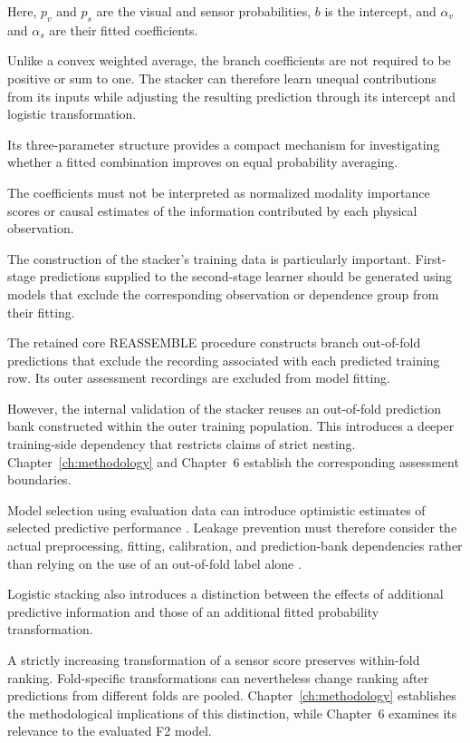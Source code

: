 Here, \(p_v\) and \(p_s\) are the visual and sensor probabilities, \(b\) is the intercept, and \(\alpha_v\) and \(\alpha_s\) are their fitted coefficients.

Unlike a convex weighted average, the branch coefficients are not required to be positive or sum to one. The stacker can therefore learn unequal contributions from its inputs while adjusting the resulting prediction through its intercept and logistic transformation.

Its three-parameter structure provides a compact mechanism for investigating whether a fitted combination improves on equal probability averaging.

The coefficients must not be interpreted as normalized modality importance scores or causal estimates of the information contributed by each physical observation.

The construction of the stacker’s training data is particularly important. First-stage predictions supplied to the second-stage learner should be generated using models that exclude the corresponding observation or dependence group from their fitting.

The retained core REASSEMBLE procedure constructs branch out-of-fold predictions that exclude the recording associated with each predicted training row. Its outer assessment recordings are excluded from model fitting.

However, the internal validation of the stacker reuses an out-of-fold prediction bank constructed within the outer training population. This introduces a deeper training-side dependency that restricts claims of strict nesting. Chapter~\ref{ch:methodology} and Chapter~6 establish the corresponding assessment boundaries.

Model selection using evaluation data can introduce optimistic estimates of selected predictive performance \parencite{P004}. Leakage prevention must therefore consider the actual preprocessing, fitting, calibration, and prediction-bank dependencies rather than relying on the use of an out-of-fold label alone \parencite{P017}.

Logistic stacking also introduces a distinction between the effects of additional predictive information and those of an additional fitted probability transformation.

A strictly increasing transformation of a sensor score preserves within-fold ranking. Fold-specific transformations can nevertheless change ranking after predictions from different folds are pooled. Chapter~\ref{ch:methodology} establishes the methodological implications of this distinction, while Chapter~6 examines its relevance to the evaluated F2 model.

